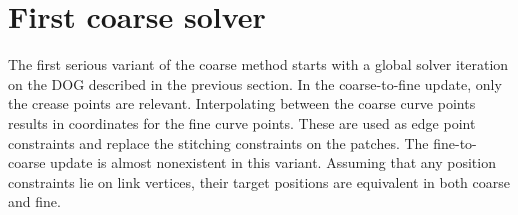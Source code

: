 \documentclass[a4paper,twoside,12pt,nochapterprefix]{scrbook}
\begin{document}
\section{First coarse solver}\label{sec:first_coarse}
The first serious variant of the coarse method starts with a global solver iteration on the DOG described in the previous section.\newline
In the coarse-to-fine update, only the crease points are relevant. Interpolating between the coarse curve points results in coordinates for the fine curve points. These are used as edge point constraints and replace the stitching constraints on the patches.\newline
The fine-to-coarse update is almost nonexistent in this variant. Assuming that any position constraints lie on link vertices, their target positions are equivalent in both coarse and fine.\newline
\end{document}
